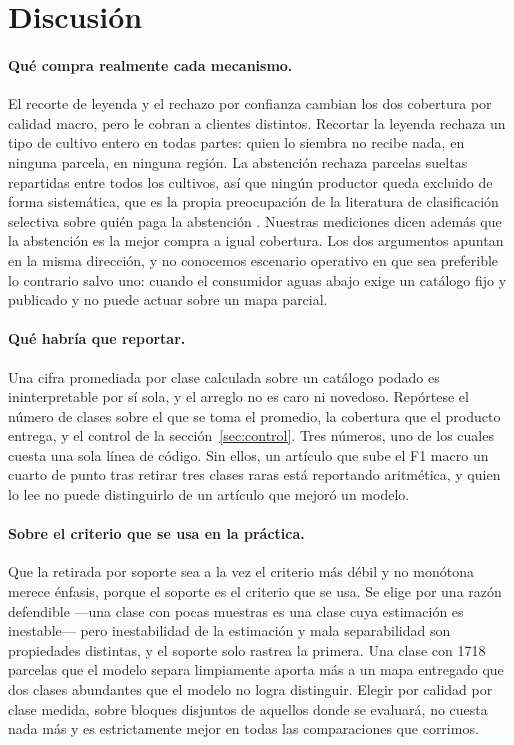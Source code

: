 \section{Discusión}
\label{sec:discusion}

\paragraph{Qué compra realmente cada mecanismo.}
El recorte de leyenda y el rechazo por confianza cambian los dos cobertura por calidad macro, pero
le cobran a clientes distintos. Recortar la leyenda rechaza un tipo de cultivo entero en todas
partes: quien lo siembra no recibe nada, en ninguna parcela, en ninguna región. La abstención
rechaza parcelas sueltas repartidas entre todos los cultivos, así que ningún productor queda
excluido de forma sistemática, que es la propia preocupación de la literatura de clasificación
selectiva sobre quién paga la abstención \cite{jones2020selectivedisparities}. Nuestras mediciones
dicen además que la abstención es la mejor compra a igual cobertura. Los dos argumentos apuntan en
la misma dirección, y no conocemos escenario operativo en que sea preferible lo contrario salvo
uno: cuando el consumidor aguas abajo exige un catálogo fijo y publicado y no puede actuar sobre un
mapa parcial.

\paragraph{Qué habría que reportar.}
Una cifra promediada por clase calculada sobre un catálogo podado es ininterpretable por sí sola, y
el arreglo no es caro ni novedoso. Repórtese el número de clases sobre el que se toma el promedio,
la cobertura que el producto entrega, y el control de la sección~\ref{sec:control}. Tres números,
uno de los cuales cuesta una sola línea de código. Sin ellos, un artículo que sube el F1 macro un
cuarto de punto tras retirar tres clases raras está reportando aritmética, y quien lo lee no puede
distinguirlo de un artículo que mejoró un modelo.

\paragraph{Sobre el criterio que se usa en la práctica.}
Que la retirada por soporte sea a la vez el criterio más débil y no monótona merece énfasis, porque
el soporte es el criterio que se usa. Se elige por una razón defendible —una clase con pocas
muestras es una clase cuya estimación es inestable— pero inestabilidad de la estimación y mala
separabilidad son propiedades distintas, y el soporte solo rastrea la primera. Una clase con
\num{1718} parcelas que el modelo separa limpiamente aporta más a un mapa entregado que dos clases
abundantes que el modelo no logra distinguir. Elegir por calidad por clase medida, sobre bloques
disjuntos de aquellos donde se evaluará, no cuesta nada más y es estrictamente mejor en todas las
comparaciones que corrimos.

